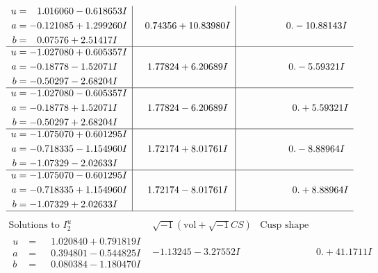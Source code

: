 \documentclass[1p]{elsarticle_modified}
\theoremstyle{definition}
\newcommand{\I}{\sqrt{-1}}
\begin{document}
$$\begin{array}{c|c|c}
\begin{aligned}
u &= \phantom{-}1.016060 - 0.618653 I \\
a &= -0.121085 + 1.299260 I \\
b &= \phantom{-}0.07576 + 2.51417 I\end{aligned}
 & \phantom{-}0.74356 + 10.83980 I & \phantom{-0.000000 } 0. - 10.88143 I \\ \hline\begin{aligned}
u &= -1.027080 + 0.605357 I \\
a &= -0.18778 - 1.52071 I \\
b &= -0.50297 - 2.68204 I\end{aligned}
 & \phantom{-}1.77824 + 6.20689 I & \phantom{-0.000000 } 0. - 5.59321 I \\ \hline\begin{aligned}
u &= -1.027080 - 0.605357 I \\
a &= -0.18778 + 1.52071 I \\
b &= -0.50297 + 2.68204 I\end{aligned}
 & \phantom{-}1.77824 - 6.20689 I & \phantom{-0.000000 -}0. + 5.59321 I \\ \hline\begin{aligned}
u &= -1.075070 + 0.601295 I \\
a &= -0.718335 - 1.154960 I \\
b &= -1.07329 - 2.02633 I\end{aligned}
 & \phantom{-}1.72174 + 8.01761 I & \phantom{-0.000000 } 0. - 8.88964 I \\ \hline\begin{aligned}
u &= -1.075070 - 0.601295 I \\
a &= -0.718335 + 1.154960 I \\
b &= -1.07329 + 2.02633 I\end{aligned}
 & \phantom{-}1.72174 - 8.01761 I & \phantom{-0.000000 -}0. + 8.88964 I\\
 \hline 
 \end{array}$$\newpage$$\begin{array}{c|c|c}  
\text{Solutions to }I^u_{2}& \I (\text{vol} + \sqrt{-1}CS) & \text{Cusp shape}\\
 \hline 
\begin{aligned}
u &= \phantom{-}1.020840 + 0.791819 I \\
a &= \phantom{-}0.394801 - 0.544825 I \\
b &= \phantom{-}0.080384 - 1.180470 I\end{aligned}
 & -1.13245 - 3.27552 I & \phantom{-0.000000 -}0. + 41.1711 I \\ \hline\begin{aligned}

\end{aligned}
\end{array}$$
\end{document}

